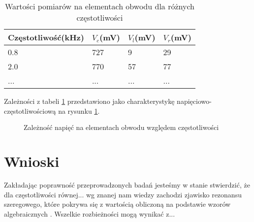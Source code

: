 \documentclass[polish,a4paper]{article}
\begin{document}
\begin{table}[!h]
\centering
\begin{tabular}{llll}
\hline
Częstotliwość(kHz) & $V_c$(mV) & $V_l$(mV) & $V_r$(mV) \\ \hline
0.8                & 727    & 9      & 29     \\
2.0                & 770    & 57     & 77     \\
...                & ...    & ...    & ...    \\ \hline
\end{tabular}
\caption{Wartości pomiarów na elementach obwodu dla różnych częstotliwości}
\label{my-label}
\end{table}

Zależności z tabeli \ref{my-label} przedstawiono jako charakterystykę napięciowo-częstotliwościową na rysunku \ref{fig:wyk}.
\begin{figure}[!h]
\centering
{}
\caption{Zależność napięć na elementach obwodu względem częstotliwości}
\label{fig:wyk}
\end{figure}

\section{Wnioski}
Zakładając poprawność przeprowadzonych badań jesteśmy w stanie stwierdzić, że dla częstotliwości równej... wg znanej nam wiedzy \cite{bolkowski1986teoria} zachodzi zjawisko rezonansu szeregowego, które pokrywa się z wartością obliczoną na podstawie wzorów algebraicznych \cite{bolkowski1986teoria}. Wszelkie rozbieżności mogą wynikać z...



\end{document}

